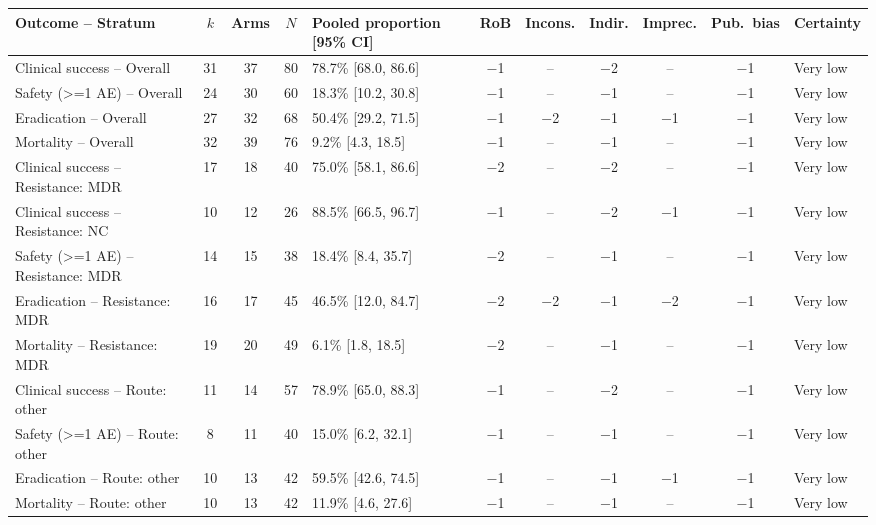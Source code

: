 \begin{tabular}{lccclccccc l}
\toprule
Outcome -- Stratum & $k$ & Arms & $N$ & Pooled proportion [95\% CI] & RoB & Incons. & Indir. & Imprec. & Pub.\ bias & Certainty \\
\midrule
Clinical success -- Overall & 31 & 37 & 80 & 78.7\% [68.0, 86.6] & $-$1 & -- & $-$2 & -- & $-$1 & Very low \\
Safety (>=1 AE) -- Overall & 24 & 30 & 60 & 18.3\% [10.2, 30.8] & $-$1 & -- & $-$1 & -- & $-$1 & Very low \\
Eradication -- Overall & 27 & 32 & 68 & 50.4\% [29.2, 71.5] & $-$1 & $-$2 & $-$1 & $-$1 & $-$1 & Very low \\
Mortality -- Overall & 32 & 39 & 76 & 9.2\% [4.3, 18.5] & $-$1 & -- & $-$1 & -- & $-$1 & Very low \\
Clinical success -- Resistance: MDR & 17 & 18 & 40 & 75.0\% [58.1, 86.6] & $-$2 & -- & $-$2 & -- & $-$1 & Very low \\
Clinical success -- Resistance: NC & 10 & 12 & 26 & 88.5\% [66.5, 96.7] & $-$1 & -- & $-$2 & $-$1 & $-$1 & Very low \\
Safety (>=1 AE) -- Resistance: MDR & 14 & 15 & 38 & 18.4\% [8.4, 35.7] & $-$2 & -- & $-$1 & -- & $-$1 & Very low \\
Eradication -- Resistance: MDR & 16 & 17 & 45 & 46.5\% [12.0, 84.7] & $-$2 & $-$2 & $-$1 & $-$2 & $-$1 & Very low \\
Mortality -- Resistance: MDR & 19 & 20 & 49 & 6.1\% [1.8, 18.5] & $-$2 & -- & $-$1 & -- & $-$1 & Very low \\
Clinical success -- Route: other & 11 & 14 & 57 & 78.9\% [65.0, 88.3] & $-$1 & -- & $-$2 & -- & $-$1 & Very low \\
Safety (>=1 AE) -- Route: other & 8 & 11 & 40 & 15.0\% [6.2, 32.1] & $-$1 & -- & $-$1 & -- & $-$1 & Very low \\
Eradication -- Route: other & 10 & 13 & 42 & 59.5\% [42.6, 74.5] & $-$1 & -- & $-$1 & $-$1 & $-$1 & Very low \\
Mortality -- Route: other & 10 & 13 & 42 & 11.9\% [4.6, 27.6] & $-$1 & -- & $-$1 & -- & $-$1 & Very low \\
\bottomrule
\end{tabular}
